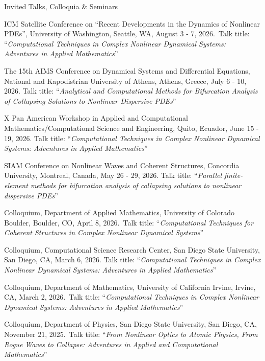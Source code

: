 \documentclass[10pt]{article} %
\begin{document}
\begin{section}{Invited Talks, Colloquia \& Seminars}
\begin{etaremune}
\item ICM Satellite Conference on ``Recent Developments in the Dynamics of Nonlinear PDEs'',
University of Washington, Seattle, WA, August 3 - 7, 2026.~Talk title: ``\textit{Computational Techniques in Complex Nonlinear Dynamical Systems: Adventures in Applied Mathematics}''

\item The 15th AIMS Conference on Dynamical Systems and Differential Equations, National and Kapodistrian University of Athens, Athens, Greece, %
July 6 - 10, 2026. Talk title: ``\textit{Analytical and Computational Methods for Bifurcation Analysis of Collapsing Solutions to Nonlinear Dispersive PDEs}''

\item X Pan American Workshop in Applied and Computational Mathematics/Computational Science and Engineering, Quito, Ecuador, June 15 - 19, 2026. Talk title: ``\textit{Computational Techniques in Complex Nonlinear Dynamical Systems: Adventures in Applied Mathematics}''

\item SIAM Conference on Nonlinear Waves and Coherent Structures, Concordia University, Montreal, Canada, May 26 - 29, 2026.
Talk title: ``\textit{Parallel finite-element methods for bifurcation analysis of collapsing solutions to nonlinear dispersive PDEs}''

\item Colloquium, Department of Applied Mathematics, University of Colorado Boulder, Boulder, CO, April 8, 2026.~Talk title: ``\textit{Computational Techniques for Coherent Structures in Complex Nonlinear Dynamical Systems}''

\item Colloquium, Computational Science Research Center, San Diego State University, San Diego, CA, March 6, 2026.
Talk title: ``\textit{Computational Techniques in Complex Nonlinear Dynamical Systems: Adventures in Applied Mathematics}''

\item Colloquium, Department of Mathematics, University of California Irvine, Irvine, CA, March 2, 2026.~Talk title: ``\textit{Computational Techniques in Complex Nonlinear Dynamical Systems: Adventures in Applied Mathematics}''

\item Colloquium, Department of Physics, San Diego State University, San Diego, CA, November 21, 2025.~Talk title: ``\textit{From Nonlinear Optics to Atomic Physics, From Rogue Waves to Collapse:
Adventures in Applied and Computational Mathematics}''


\end{etaremune}
\end{section}
\end{document}
